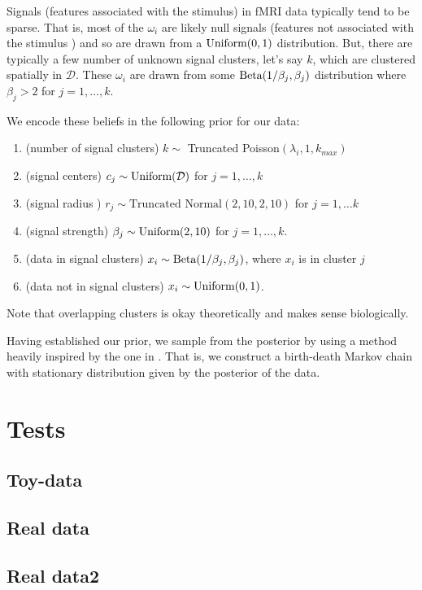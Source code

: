 \documentclass[12pt]{article}
\begin{document}
Signals (features associated with the stimulus) in fMRI data typically tend to be sparse.  That is, most of the $\omega_i$ are likely null signals (features not associated with the stimulus )
and so are drawn from a $\mbox{Uniform}(0,1)$ distribution.  But, there are typically a few number of unknown signal clusters,  let's say $k$,
which are clustered spatially in $\mathcal{D}$.  These $\omega_i$ are drawn from some $\mbox{Beta}(1/\beta_j, \beta_j)$ distribution where $\beta_j > 2$ for $j = 1, \ldots, k$.  

We encode these beliefs in the following prior for our data:
\begin{enumerate}
\item (number of signal clusters) $k \sim$ Truncated Poisson$(\lambda_i,  1, k_{max})$
\item (signal centers)  $c_j \sim \mbox{Uniform}(\mathcal{D})$ for $j = 1, \ldots, k$
\item (signal radius )  $r_j \sim \mbox{Truncated Normal}(2,10,2,10)$ for $j = 1, \ldots k$
\item  (signal strength) $\beta_j \sim \mbox{Uniform}(2,10)$ for $j = 1, \ldots, k$. 
\item (data in signal clusters) $x_i \sim \mbox{Beta}(1/\beta_j, \beta_j)$, where $x_i$ is in cluster $j$
\item (data not in signal clusters) $x_i \sim \mbox{Uniform}(0,1)$. 
\end{enumerate}

Note that overlapping clusters is okay theoretically and makes sense biologically. 

Having established our prior, we sample from the posterior by using a method heavily inspired by the one in \cite{stephens2000bayesian}. That is, we 
construct a birth-death Markov chain with stationary distribution given by the posterior of the data. 


\section{Tests}

\subsection{Toy-data}

\subsection{Real data}

\subsection{Real data2}








\end{document}
